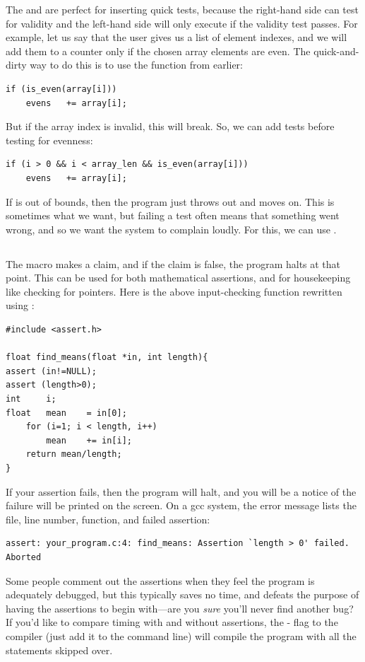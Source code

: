 The \ci{\&\&} and \ci{||} are perfect for inserting quick tests,
because the right-hand side can test for validity and the left-hand
side will only execute if the validity test passes. For example, 
let us say that the user gives us a list of element indexes, and we will
add them to a counter only if the chosen array elements are even. The
quick-and-dirty way to do this is to use the  function
from earlier:
\begin{lstlisting}
if (is_even(array[i]))
    evens   += array[i];
\end{lstlisting}
But if the array index is invalid, this will break. So, we can add tests
before testing for evenness:
\begin{lstlisting}
if (i > 0 && i < array_len && is_even(array[i]))
    evens   += array[i];
\end{lstlisting}
If  is out of bounds, then the program just throws  out and 
moves on. This is sometimes what we want, but failing a test often means
that something went wrong, and so we want the system to complain loudly.
For this, we can use .

\subsection{} 
The  macro makes a claim, and if the claim is false, the
program halts at that point. This can be used for both mathematical
assertions, and for housekeeping like checking for 
pointers. Here is the above input-checking function rewritten using
:
\begin{lstlisting}
#include <assert.h>

float find_means(float *in, int length){
assert (in!=NULL);
assert (length>0);
int     i;
float   mean    = in[0];
    for (i=1; i < length, i++)
        mean    += in[i];
    return mean/length;
}
\end{lstlisting}

If your assertion fails, then the program will halt, and you will be
a notice of the failure will be printed on the screen. On a gcc system,
the error message lists the file, line number, function, and failed assertion:
\begin{lstlisting}
assert: your_program.c:4: find_means: Assertion `length > 0' failed.
Aborted
\end{lstlisting}

Some people comment out the assertions when they feel the program is
adequately debugged, but this typically saves no time, and defeats the
purpose of having the assertions to begin with---are you {\em sure}
you'll never find another bug? If you'd like to compare timing with and
without assertions, the - flag to the compiler (just
add it to the command line) will compile the program with all the
 statements skipped over.

